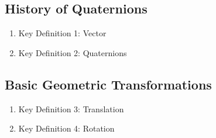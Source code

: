 \subsection{History of Quaternions}
	\begin{enumerate}[label={(\alph*)}]
		\item Key Definition 1: Vector
		\item Key Definition 2: Quaternions \cite{elements}
	\end{enumerate}

\subsection{Basic Geometric Transformations}
	\begin{enumerate}[label={(\alph*)}]
		\item Key Definition 3: Translation
		\item Key Definition 4: Rotation
	\end{enumerate}
